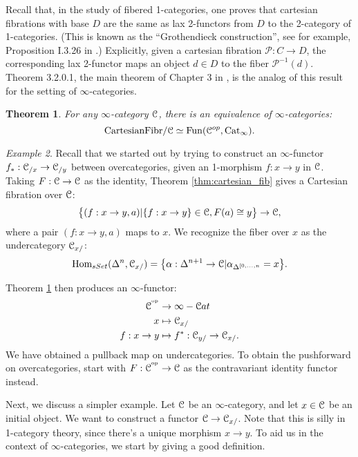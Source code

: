 \documentclass[10pt,a4paper,reqno,oneside]{book} %
\theoremstyle{plain}
\newtheorem{thm}{Theorem}[section]
\theoremstyle{definition}
\theoremstyle{remark}
\newtheorem{eg}[thm]{Example}
\numberwithin{equation}{section}
\begin{document}
Recall that, in the study of fibered 1-categories, one proves that cartesian fibrations with base $D$ are the same as
lax 2-functors from $D$ to the 2-category of 1-categories. (This is known as the ``Grothendieck construction'', see
for example, Proposition I.3.26 in \cite{FGAex}.) Explicitly, given a cartesian fibration $\mathcal{P} : C \to D$,
the corresponding lax 2-functor maps an object $d \in D$ to the fiber $\mathcal{P}^{-1}(d)$.
Theorem 3.2.0.1, the main theorem of Chapter 3 in \cite{HTT}, is the analog of this result for the setting of $\infty$-categories.

\begin{thm}
\label{thm:cartesian_equiv}
For any $\infty$-category $\mathcal C$, there is an equivalence of $\infty$-categories:
\begin{equation}		
\text{CartesianFibr}/\mathcal C \simeq \operatorname{Fun}(\mathcal C^{op},\mathrm{Cat}_{\infty}).
\end{equation}
\end{thm}

\begin{eg}
\label{eg:composition}
Recall that we started out by trying to construct an $\infty$-functor $f_* : \mathcal C_{/x} \to \mathcal C_{/y}$ between overcategories,
given an 1-morphism $f: x \to y$ in $\mathcal C$. Taking $F : \mathcal C \to \mathcal C$ as the identity, Theorem \ref{thm:cartesian_fib} gives
a Cartesian fibration over $\mathcal C$:
\[	  \big\{ (f : x \to y, a) | \{f :x \to y\} \in \mathcal C, F(a) \cong y \big\} \to \mathcal C,	\]
where a pair $(f : x \to y, a)$ maps to $x$. We recognize the fiber over $x$ as the undercategory $\mathcal C_{x/}$:
\[	\operatorname{Hom}_{sSet}(\Delta^n, \mathcal C_{x/}) = \big\{\alpha: \Delta^{n+1} \to \mathcal C | \alpha_{\Delta^{[0,\dots,n}} = x \big\}.	\]

Theorem \ref{thm:cartesian_equiv} then produces an $\infty$-functor:
\begin{align*}
\mathcal C^{^\mathrm{op}} &\to \infty-\mathcal C at \\
x & \mapsto \mathcal C_{x/} \\
f:x\to y & \mapsto f^* : \mathcal C_{y/} \to \mathcal C_{x/}.
\end{align*}
We have obtained a pullback map on undercategories. To obtain the pushforward on overcategories, start with $F : \mathcal C^{^\mathrm{op}} \to \mathcal C$
as the contravariant identity functor instead.
\end{eg}

Next, we discuss a simpler example. Let $\mathcal C$ be an $\infty$-category, and let $x \in \mathcal C$ be an initial object. 
We want to construct a functor $\mathcal C \to \mathcal C_{x/}$. Note that this is silly in 1-category theory, since there's a unique 
morphism $x \to y$. To aid us in the context of $\infty$-categories, we start
by giving a good definition. 
\end{document}
